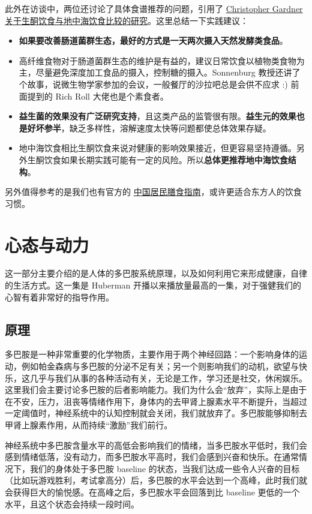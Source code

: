 \documentclass{report}
\begin{document}
此外在访谈中，两位还讨论了具体食谱推荐的问题，引用了 \href{https://youtu.be/sJLK3sVexIk}{Christopher Gardner 关于生酮饮食与地中海饮食比较的研究}。这里总结一下实践建议：

\begin{itemize}
    \item \textbf{如果要改善肠道菌群生态，最好的方式是一天两次摄入天然发酵类食品}。
    \item 高纤维食物对于肠道菌群生态的维护是有益的，建议日常饮食以植物类食物为主，尽量避免深度加工食品的摄入，控制糖的摄入。Sonnenburg 教授还讲了个故事，说微生物学家参加的会议，一般餐厅的沙拉吧总是会供不应求 :) 前面提到的 Rich Roll 大佬也是个素食者。
    \item \textbf{益生菌的效果没有广泛研究支持}，且这类产品的监管很有限。\textbf{益生元的效果也是好坏参半}，缺乏多样性，溶解速度太快等问题都使总体效果存疑。
    \item 地中海饮食相比生酮饮食来说对健康的影响效果接近，但更容易坚持遵循。另外生酮饮食如果长期实践可能有一定的风险。所以\textbf{总体更推荐地中海饮食结构}。
\end{itemize}

另外值得参考的是我们也有官方的 \href{https://sspai.com/post/72984}{中国居民膳食指南}，或许更适合东方人的饮食习惯。

\chapter{心态与动力}

这一部分主要介绍的是人体的多巴胺系统原理，以及如何利用它来形成健康，自律的生活方式。这一集是 Huberman 开播以来播放量最高的一集，对于强健我们的心智有着非常好的指导作用。

\section{原理}

多巴胺是一种非常重要的化学物质，主要作用于两个神经回路：一个影响身体的运动，例如帕金森病与多巴胺的分泌不足有关；另一个则影响我们的动机，欲望与快乐，这几乎与我们从事的各种活动有关，无论是工作，学习还是社交，休闲娱乐。这里我们会主要讨论多巴胺的后者影响能力。我们为什么会“放弃”，实际上是由于在不安，压力，沮丧等情绪作用下，身体内的去甲肾上腺素水平不断提升，当超过一定阈值时，神经系统中的认知控制就会关闭，我们就放弃了。多巴胺能够抑制去甲肾上腺素作用，从而持续“激励”我们前行。

神经系统中多巴胺含量水平的高低会影响我们的情绪，当多巴胺水平低时，我们会感到情绪低落，没有动力，而多巴胺水平高时，我们会感到兴奋和快乐。在通常情况下，我们的身体处于多巴胺 baseline 的状态，当我们达成一些令人兴奋的目标（比如玩游戏胜利，考试拿高分）后，多巴胺的水平会达到一个高峰，此时我们就会获得巨大的愉悦感。在高峰之后，多巴胺水平会回落到比 baseline 更低的一个水平，且这个状态会持续一段时间。
\end{document}
